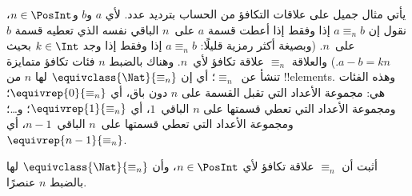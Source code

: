 \documentclass[../../../include/open-logic-section]{subfiles}
\begin{document}
\begin{ex}
يأتي مثال جميل على علاقات التكافؤ من الحساب بترديد عدد. لأي $a$ و$b$
و$n \in \PosInt$، نقول إن $a \equiv_n b$ إذا وفقط إذا أعطت قسمة $a$
على~$n$ الباقي نفسه الذي تعطيه قسمة $b$ على~$n$. (وبصيغة أكثر رمزية
قليلًا: $a \equiv_n b$ إذا وفقط إذا وجد $k \in \Int$ بحيث
$a - b = kn$.) والعلاقة $\equiv_n$ علاقة تكافؤ لأي~$n$. وهناك بالضبط
$n$ فئات تكافؤ متمايزة تنشأ عن~$\equiv_n$؛ أي إن
$\equivclass{\Nat}{\equiv_n}$ لها $n$ من !!{element}s. وهذه الفئات هي:
مجموعة الأعداد التي تقبل القسمة على $n$ دون باق، أي
$\equivrep{0}{\equiv_n}$؛ ومجموعة الأعداد التي تعطي قسمتها على $n$
الباقي~$1$، أي $\equivrep{1}{\equiv_n}$؛ و\ldots؛ ومجموعة الأعداد التي
تعطي قسمتها على~$n$ الباقي~$n-1$، أي~$\equivrep{n-1}{\equiv_n}$.
\end{ex}

\begin{prob}
أثبت أن $\equiv_n$ علاقة تكافؤ لأي $n \in
\PosInt$، وأن $\equivclass{\Nat}{\equiv_n}$ لها بالضبط $n$ عنصرًا.
\end{prob}
\end{document}
